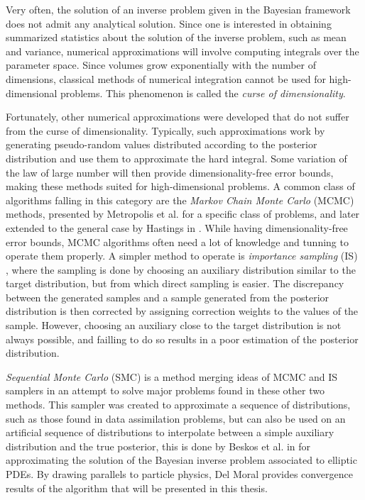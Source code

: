 Very often, the solution of an inverse problem given in the Bayesian framework does not admit any analytical solution. Since one is interested in obtaining summarized statistics about the solution of the inverse problem, such as mean and variance, numerical approximations will involve computing integrals over the parameter space. Since volumes grow exponentially with the number of dimensions, classical methods of numerical integration cannot be used for high-dimensional problems. This phenomenon is called the \textit{curse of dimensionality}.

Fortunately, other numerical approximations were developed that do not suffer from the curse of dimensionality. Typically, such approximations work by generating pseudo-random values distributed according to the posterior distribution and use them to approximate the hard integral. Some variation of the law of large number will then provide dimensionality-free error bounds, making these methods suited for high-dimensional problems. A common class of algorithms falling in this category are the \textit{Markov Chain Monte Carlo} (MCMC) methods, presented by Metropolis et al. \cite{metropolis1953equation} for a specific class of problems, and later extended to the general case by Hastings in \cite{hastings1970monte}. While having dimensionality-free error bounds, MCMC algorithms often need a lot of knowledge and tunning to operate them properly. A simpler method to operate is \textit{importance sampling} (IS) , where the sampling is done by choosing an auxiliary distribution similar to the target distribution, but from which direct sampling is easier. The discrepancy between the generated samples and a sample generated from the posterior distribution is then corrected by assigning correction weights to the values of the sample. However, choosing an auxiliary close to the target distribution is not always possible, and failling to do so results in a poor estimation of the posterior distribution.

\textit{Sequential Monte Carlo} (SMC) \cite{del_moral_2006} is a method merging ideas of MCMC and IS samplers in an attempt to solve major problems found in these other two methods. This sampler was created to approximate a sequence of distributions, such as those found in data assimilation problems, but can also be used on an artificial sequence of distributions to interpolate between a simple auxiliary distribution and the true posterior, this is done by Beskos et al. in \cite{beskos2015sequential} for approximating the solution of the Bayesian inverse problem associated to elliptic PDEs. By drawing parallels to particle physics, Del Moral \cite{del2013mean, del2004feynman} provides convergence results of the algorithm that will be presented in this thesis.

